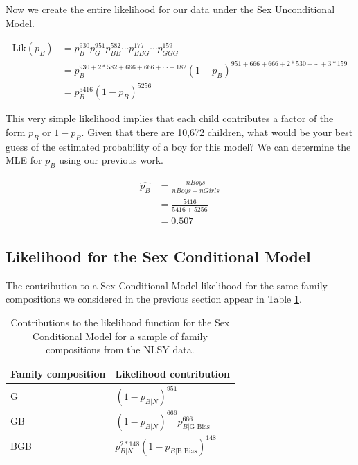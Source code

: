 \documentclass[
]{krantz}
\newcommand{\Lik}{\mathrm{Lik}}
\newcommand{\neutral}{p_{B|N}}
\newcommand{\gbias}{p_{B|\textrm{G Bias}}}
\newcommand{\bbias}{p_{B|\textrm{B Bias}}}
\begin{document}
Now we create the entire likelihood for our data under the Sex Unconditional Model.

\begin{align*}
 \Lik(p_B) &= p_B^{930}p_G^{951}p_{BB}^{582} \cdots p_{BBG}^{177} \cdots p_{GGG}^{159} \\
 &= p_B^{930+2*582+666+666+\cdots+182}(1-p_B)^{951+666+666+2*530+\cdots+3*159} \\
 &=  p_B^{5416}(1-p_B)^{5256}
\end{align*}

This very simple likelihood implies that each child contributes a factor of the form \(p_B\) or \(1-p_B\). Given that there are 10,672 children, what would be your best guess of the estimated probability of a boy for this model? We can determine the MLE for \(p_B\) using our previous work.

\begin{equation*}
\begin{split}
 \hat{p_B} &= \frac{nBoys}{nBoys + nGirls} \\
 & =  \frac{5416}{5416+5256} \\
 &= 0.507
\end{split}
\end{equation*}

\subsection{Likelihood for the Sex Conditional Model}\label{sex-cond-lik}

The contribution to a Sex Conditional Model likelihood for the same family compositions we considered in the previous section appear in Table \ref{tab:sexcondmodel}.

\begin{table}
\centering
\caption{\label{tab:sexcondmodel}Contributions to the likelihood function for the Sex Conditional Model for a sample of family compositions from the NLSY data.}
\centering
\begin{tabular}[t]{>{\raggedright\arraybackslash}p{5cm}>{\raggedright\arraybackslash}p{5cm}}
\toprule
Family composition & Likelihood contribution\\
\midrule
G & $(1-\neutral)^{951}$\\
GB & $(1-\neutral)^{666}\gbias^{666}$\\
BGB & $\neutral^{2*148}(1-\bbias)^{148}$\\
\bottomrule
\end{tabular}
\end{table}
\end{document}
